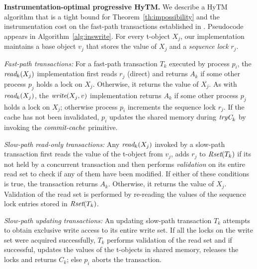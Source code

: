 \noindent\textbf{Instrumentation-optimal progressive HyTM.}
We describe a HyTM algorithm that is a tight bound for Theorem~\ref{th:impossibility} and the instrumentation cost on the fast-path transactions established in \cite{hytm14disc}.
Pseudocode appears in Algorithm~\ref{alg:inswrite}.
For every t-object $X_j$, our implementation maintains a base object $v_j$ that stores the value of $X_j$
and a \emph{sequence lock} $r_{j}$. 

\vspace{1mm}\noindent\textit{Fast-path transactions:}
For a fast-path transaction $T_k$ executed by process $p_i$, the $\textit{read}_k(X_j)$ implementation first reads $r_j$ (direct)
and returns $A_k$ if some other process $p_j$ holds a lock on $X_j$.
Otherwise, it returns the value of $X_j$.
As with $\textit{read}_k(X_j)$, the $\textit{write} (X_j,v)$ implementation returns $A_k$ if some other process $p_j$ holds a lock on $X_j$; otherwise
process $p_i$ increments the sequence lock $r_j$. If the cache has not been invalidated, $p_i$ updates the shared memory
during $\textit{tryC}_k$ by invoking the $\ms{commit-cache}$ primitive.

\vspace{1mm}\noindent\textit{Slow-path read-only transactions:}
Any $\textit{read}_k(X_j)$ invoked by a slow-path transaction first reads the value of the t-object from $v_j$, 
adds $r_j$ to $\textit{Rset}(T_k)$ if its not held by a concurrent transaction
and then performs \emph{validation} on its entire read set to check if any of them have been modified. 
If either of these conditions is true,
the transaction returns $A_k$. Otherwise, it returns the value of $X_j$. 
Validation of the read set is performed by re-reading the values of the sequence lock entries stored in $\textit{Rset}(T_k)$.

\vspace{1mm}\noindent\textit{Slow-path updating transactions:}
An updating slow-path transaction $T_k$ attempts to obtain exclusive write access to its 
entire write set.
If all the locks on the write set were acquired successfully, $T_k$ performs validation of the read set and if successful, updates the values of
the t-objects in shared memory, releases the locks and returns $C_k$; else $p_i$ aborts the transaction.

